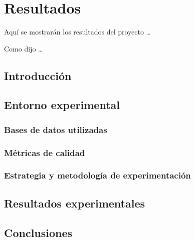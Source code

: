 
\chapter{Resultados}
\label{cha:resultados}

Aquí se mostrarán los resultados del proyecto \ldots

Como dijo \cite{lin2015microsoft} \ldots

\section{Introducción}
\label{sec:intro-resultados}

\section{Entorno experimental}
\label{sec:desarrollo-resultados}

\subsection{Bases de datos utilizadas}
\label{subsec:bases-datos}

\subsection{Métricas de calidad}
\label{subsec:metricas-calidad}

\subsection{Estrategia y metodología de experimentación}
\label{subsec:estrategia-metodologia}

\section{Resultados experimentales}
\label{sec:resultados-experimentales}

\section{Conclusiones}
\label{sec:conclu-resultados}